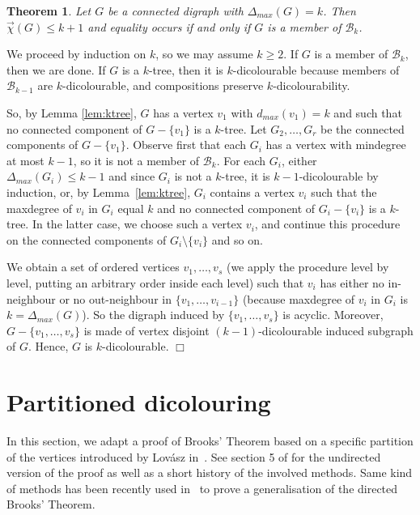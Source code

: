 \documentclass[11pt]{article}
\newtheorem{theorem}[lemma]{Theorem}
\newcommand{\dic}{\vec{\chi}}
\newcommand{\dmax}{\Delta_{max}}
\newcounter{claim}
\newenvironment{proof}[1][]%
 {\noindent {\setcounter{claim}{0}\sc proof ---
   }{#1}{}}{\hfill$\Box$\vspace{2ex}}
\begin{document}
\begin{theorem}
Let $G$ be a connected digraph with $\Delta_{max}(G) = k$. Then $\dic(G) \leq k+1$ and equality occurs if and only if $G$ is a member of $\mathcal B_k$. 
\end{theorem}

\begin{proof} 
We proceed by induction on $k$, so we may assume $k \geq 2$. 
If $G$ is a member of $\mathcal B_k$, then we are done.  If $G$ is a $k$-tree, then it is $k$-dicolourable because members of $\mathcal B_{k-1}$ are $k$-dicolourable, and compositions preserve $k$-dicolourability. 

So, by Lemma \ref{lem:ktree}, $G$ has a vertex $v_1$ with $d_{max}(v_1) = k$ and such that no connected component of $G-\{v_1\}$ is a $k$-tree. Let $G_2, \dots, G_r$ be the connected components of $G - \{v_1\}$. 
Observe first that each $G_i$ has a vertex with mindegree at most $k-1$, so it is not a member of $\mathcal B_k$. 
For each $G_i$, either $\dmax(G_i) \leq k-1 $ and since $G_i$ is not a $k$-tree, it is $k-1$-dicolourable by induction, or, by Lemma~\ref{lem:ktree}, $G_i$ contains a vertex $v_i$ such that the maxdegree of $v_i$ in $G_i$ equal $k$ and no connected component of $G_i - \{v_i\}$ is a $k$-tree. In the latter case, we choose such a vertex $v_i$, and continue this procedure on the connected components of $G_i \setminus \{v_i\}$ and so on. 

We obtain a set of ordered vertices $v_1, \dots, v_s$ (we apply the procedure level by level, putting an arbitrary order inside each level) such that $v_i$ has either no in-neighbour or no out-neighbour in $\{v_1, \dots, v_{i-1}\}$ (because maxdegree of $v_i$ in $G_i$ is $k = \dmax(G)$). So the digraph induced by $\{v_1, \dots, v_s\}$ is acyclic. 
Moreover, $G-\{v_1, \dots, v_s\}$ is made of vertex disjoint $(k-1)$-dicolourable induced subgraph of $G$. Hence, $G$ is $k$-dicolourable.  
\end{proof}


\section{Partitioned dicolouring}
In this section, we adapt a proof of Brooks' Theorem based on a specific partition of the vertices introduced by Lov\'asz in~\cite{L66}.  See section 5 of \cite{CR14} for the undirected version of the proof as well as a short history of the involved methods. Same kind of methods has been recently used in~\cite{BSS21} to prove a generalisation of the directed Brooks' Theorem. 
\end{document}
